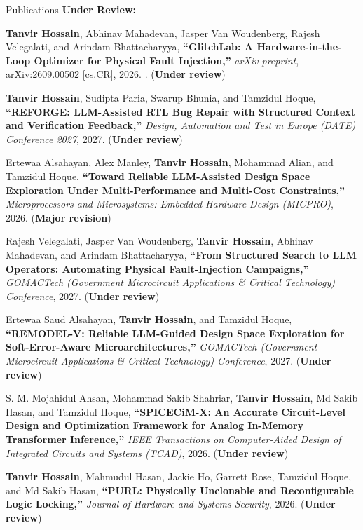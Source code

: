\begin{rSection}{Publications}
\vspace{-0.15cm}
\textbf{Under Review:}
\vspace{-0.15cm}

\begin{enumerate}[label=\arabic*.]
    \item \textbf{Tanvir Hossain}, Abhinav Mahadevan, Jasper Van Woudenberg, Rajesh Velegalati, and Arindam Bhattacharyya, \textbf{``GlitchLab: A Hardware-in-the-Loop Optimizer for Physical Fault Injection,''} \emph{arXiv preprint}, arXiv:2609.00502 [cs.CR], 2026. . (\textbf{Under review})

    \item \textbf{Tanvir Hossain}, Sudipta Paria, Swarup Bhunia, and Tamzidul Hoque, \textbf{``REFORGE: LLM-Assisted RTL Bug Repair with Structured Context and Verification Feedback,''} \emph{Design, Automation and Test in Europe (DATE) Conference 2027}, 2027. (\textbf{Under review})

    \item Ertewaa Alsahayan, Alex Manley, \textbf{Tanvir Hossain}, Mohammad Alian, and Tamzidul Hoque, \textbf{``Toward Reliable LLM-Assisted Design Space Exploration Under Multi-Performance and Multi-Cost Constraints,''} \emph{Microprocessors and Microsystems: Embedded Hardware Design (MICPRO)}, 2026. (\textbf{Major revision})

    \item Rajesh Velegalati, Jasper Van Woudenberg, \textbf{Tanvir Hossain}, Abhinav Mahadevan, and Arindam Bhattacharyya, \textbf{``From Structured Search to LLM Operators: Automating Physical Fault-Injection Campaigns,''} \emph{GOMACTech (Government Microcircuit Applications \& Critical Technology) Conference}, 2027. (\textbf{Under review})

    \item Ertewaa Saud Alsahayan, \textbf{Tanvir Hossain}, and Tamzidul Hoque, \textbf{``REMODEL-V: Reliable LLM-Guided Design Space Exploration for Soft-Error-Aware Microarchitectures,''} \emph{GOMACTech (Government Microcircuit Applications \& Critical Technology) Conference}, 2027. (\textbf{Under review})

    \begin{sloppypar}
    \item S. M. Mojahidul Ahsan, Mohammad Sakib Shahriar, \textbf{Tanvir Hossain}, Md Sakib Hasan, and Tamzidul Hoque, \textbf{``SPICECiM-X: An Accurate Circuit-Level Design and Optimization Framework for Analog In-Memory Transformer Inference,''} \emph{IEEE Transactions on Computer-Aided Design of Integrated Circuits and Systems (TCAD)}, 2026. (\textbf{Under review})
    \end{sloppypar}

    \item \textbf{Tanvir Hossain}, Mahmudul Hasan, Jackie Ho, Garrett Rose, Tamzidul Hoque, and Md Sakib Hasan, \textbf{``PURL: Physically Unclonable and Reconfigurable Logic Locking,''} \emph{Journal of Hardware and Systems Security}, 2026. (\textbf{Under review})
\end{enumerate}
\end{rSection}
